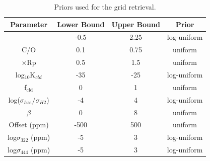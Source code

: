 \documentclass[sn-standardnature]{sn-jnl}%
\begin{document}
\begin{table}[]
\begin{tabular}{cccc}
\hline
\textbf{Parameter} & \textbf{Lower Bound} & \textbf{Upper Bound} & \textbf{Prior} \\ \hline
[M/H]	&	-0.5	&	2.25	&	log-uniform	\\
C/O	&	0.1	&	0.75	&	uniform	\\
$\times$Rp	&	0.5	&	1.5	&	uniform	\\
log$_{10}$K$_{cld}$	&	-35	&	-25	&	log-uniform	\\
f$_{\text{cld}}$	&	0	&	1	&	uniform	\\
log($\sigma_{hze}/\sigma_{H2}$)	&	-4	&	4	&	log-uniform	\\
$\beta$	&	0	&	8	&	uniform	\\
Offset (ppm)	&	-500	&	500	&	uniform	\\
log$\sigma_{322}$ (ppm)	&	-5	&	3	&	log-uniform	\\
log$\sigma_{444}$ (ppm)	&	-5	&	3	&	log-uniform	\\
\hline
\end{tabular}
\caption{Priors used for the grid retrieval.}
\label{SI-grid_priors}
\end{table}
\end{document}
